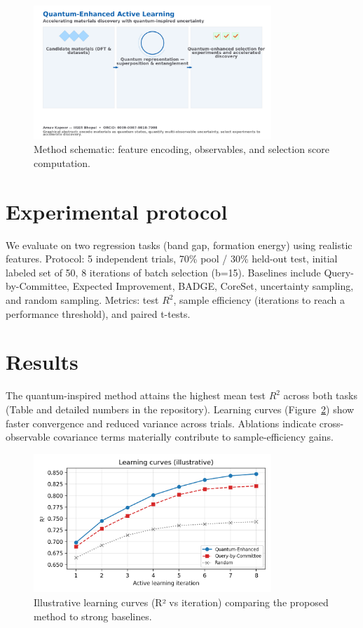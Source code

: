 \documentclass[11pt]{article}
\begin{document}
\begin{figure}[ht]
\centering
\includegraphics[width=0.8\textwidth]{graphical_abstract.png}
\caption{Method schematic: feature encoding, observables, and selection score computation.}
\label{fig:schematic}
\end{figure}

\section*{Experimental protocol}
We evaluate on two regression tasks (band gap, formation energy) using realistic features. Protocol: 5 independent trials, 70\% pool / 30\% held-out test, initial labeled set of 50, 8 iterations of batch selection (b=15). Baselines include Query-by-Committee, Expected Improvement, BADGE, CoreSet, uncertainty sampling, and random sampling. Metrics: test $R^2$, sample efficiency (iterations to reach a performance threshold), and paired t-tests.

\section*{Results}
The quantum-inspired method attains the highest mean test $R^2$ across both tasks (Table and detailed numbers in the repository). Learning curves (Figure~\ref{fig:learning}) show faster convergence and reduced variance across trials. Ablations indicate cross-observable covariance terms materially contribute to sample-efficiency gains.

\begin{figure}[ht]
\centering
\includegraphics[width=0.8\textwidth]{fig2_learning_curve.png}
\caption{Illustrative learning curves (R² vs iteration) comparing the proposed method to strong baselines.}
\label{fig:learning}
\end{figure}
\end{document}
